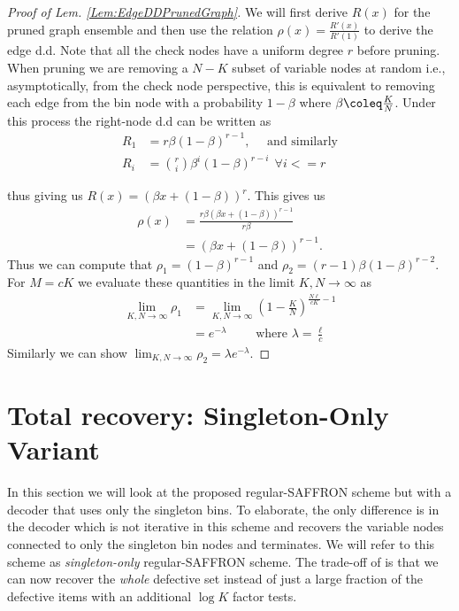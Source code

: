 \documentclass[conference,,twocolumn]{IEEEtran}
\begin{document}
\begin{proof}[Proof of Lem. \ref{Lem:EdgeDDPrunedGraph}]
We will first derive $R(x)$ for the pruned graph ensemble and then use the relation $\rho(x)=\frac{R'(x)}{R'(1)}$\cite{richardson2008modern}  to derive the edge d.d. Note that all the check nodes have a uniform degree $r$ before pruning. When pruning we are removing a $N-K$ subset of variable nodes at random i.e., asymptotically, from the check node perspective, this is equivalent to removing each edge from the bin node with a probability $1-\beta$ where $\beta\coleq \frac{K}{N}$. Under this process the right-node d.d can be written as
\begin{align}
R_1&=r\beta(1-\beta)^{r-1},\quad \text{ and similarly}\label{Eqn:Deg1ChkDistribution}\\
R_i &=\binom{r}{i} \beta^{i}(1-\beta)^{r-i} ~~\forall i<=r \nonumber
\end{align}

thus giving us $R(x)=(\beta x+(1-\beta))^{r}$. This gives us 
\begin{align*}
\rho(x)&=\frac{r\beta(\beta x+(1-\beta))^{r-1}}{r\beta}\\
          &=(\beta x+(1-\beta))^{r-1}.
\end{align*}
Thus we can compute that $\rho_1=(1-\beta)^{r-1}$ and $\rho_2=(r-1)\beta(1-\beta)^{r-2}$. For $M=c K$ we evaluate these quantities in the limit $K,N\rightarrow \infty$ as
\begin{align*}
\lim_{K,N\rightarrow \infty} \rho_1&=\lim_{K,N\rightarrow \infty} \left(1-\frac{K}{N}\right)^{\frac{N\ell}{c K}-1}\\
&=e^{-\lambda} \qquad \text{ where } \lambda=\frac{\ell}{c}
\end{align*}
Similarly we can show $\lim_{K,N\rightarrow \infty}\rho_2=\lambda e^{-\lambda}$.
\end{proof}


\section{Total recovery: Singleton-Only Variant}
In this section we will look at the proposed regular-SAFFRON scheme but with a decoder that uses only the singleton bins. To elaborate, the only difference is in the decoder which is not iterative in this scheme and recovers the variable nodes connected to only the singleton bin nodes and terminates. We will refer to this scheme as \textit{singleton-only} regular-SAFFRON scheme. The trade-off of is that we can now recover the \textit{whole} defective set instead of just a large fraction of the defective items with an additional $\log K$ factor tests.
\end{document}
